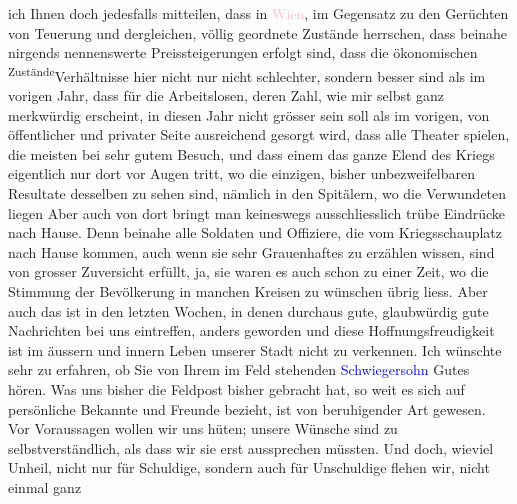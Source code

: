                     ich Ihnen doch jedesfalls mitteilen, dass in \textcolor{pink}{Wien}{}\ledrightnote{\textcolor{pink}{Wien}}, im Gegensatz zu den Gerüchten von Teuerung und dergleichen,
                    völlig geordnete Zustände herrschen, dass beinahe nirgends nennenswerte
                    Preissteigerungen erfolgt sind, dass die ökonomischen \substVorne{}\textsuperscript{Zustände}{\allowbreak}\substDazwischen{}Verhältnisse\substHinten{} hier nicht nur nicht schlechter, sondern besser sind als im vorigen
                    Jahr, dass für die Arbeitslosen, deren Zahl, wie mir selbst ganz merkwürdig
                    erscheint, in diesen Jahr nicht grösser sein soll als im vorigen, von
                    öffentlicher und privater Seite ausreichend {\pb}gesorgt wird, dass alle Theater spielen, die meisten bei sehr gutem Besuch,
                    und dass einem das ganze Elend des Kriegs eigentlich nur dort vor Augen tritt,
                    wo die einzigen, bisher unbezweifelbaren Resultate desselben zu sehen sind,
                    nämlich in den Spitälern, wo die Verwundeten liegen{\dotstwo}
                    Aber auch von dort bringt man keineswegs ausschliesslich trübe Eindrücke nach
                    Hause. Denn beinahe alle Soldaten und Offiziere, die vom Kriegsschauplatz nach
                    Hause kommen, auch wenn sie sehr Grauenhaftes zu erzählen wissen, sind von
                    grosser Zuversicht erfüllt, ja, sie waren es auch schon zu einer Zeit, wo die
                    Stimmung der Bevölkerung in manchen Kreisen zu wünschen übrig liess. Aber auch
                    das ist in den letzten Wochen, in denen durchaus gute, glaubwürdig gute
                    Nachrichten bei uns eintreffen, anders geworden und diese Hoffnungsfreudigkeit
                    ist im äussern und innern Leben unserer Stadt nicht zu verkennen.\pend
           \pstart
           Ich wünschte sehr zu erfahren, ob {\pb}Sie von
                    Ihrem im Feld stehenden \textcolor{blue}{Schwiegersohn}{} Gutes hören. Was uns bisher die Feldpost
                    bisher gebracht hat, so weit es sich auf persönliche Bekannte und
                    Freunde bezieht, ist von beruhigender Art gewesen.\pend
           \pstart
           Vor Voraussagen wollen wir uns hüten; unsere Wünsche sind zu selbstverständlich,
                    als dass wir sie erst aussprechen müssten. Und doch, wieviel Unheil, nicht nur
                    für Schuldige, sondern auch für Unschuldige flehen wir, nicht einmal ganz
